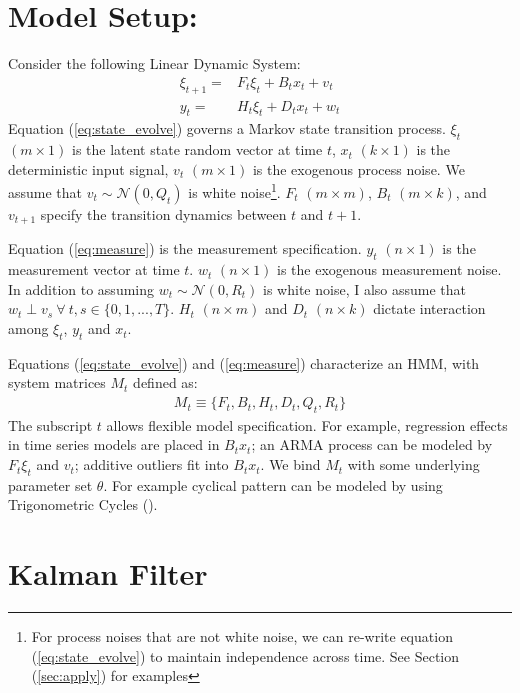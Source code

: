 \documentclass[12pt]{article}
\numberwithin{equation}{section}
\begin{document}
\section{Model Setup:} \label{sec:model_setup}
Consider the following Linear Dynamic System:
\begin{align}
    \xi_{t+1} = & F_{t}\xi_{t} + B_{t}x_t + v_t \label{eq:state_evolve} \\
    y_t = & H_t\xi_{t} + D_{t}x_t + w_t \label{eq:measure}
\end{align}
Equation (\ref{eq:state_evolve}) governs a Markov state transition process. $\xi_t$ $(m\times 1)$ is the latent state random vector at time $t$, $x_t$ $(k\times 1)$ is the deterministic input signal, $v_t$ $(m\times 1)$ is the exogenous process noise. We assume that $v_t\sim \mathcal{N}(0,Q_t)$ is white noise\footnote{For process noises that are not white noise, we can re-write equation (\ref{eq:state_evolve}) to maintain independence across time. See Section (\ref{sec:apply}) for examples}. $F_t$ $(m\times m)$, $B_t$ $(m\times k)$, and $v_{t+1}$ specify the transition dynamics between $t$ and $t+1$. 

Equation (\ref{eq:measure}) is the measurement specification. $y_t$ $(n\times 1)$ is the measurement vector at time $t$. $w_t$ $(n\times 1)$ is the exogenous measurement noise. In addition to assuming $w_t\sim \mathcal{N}(0, R_t)$ is white noise, I also assume that  $w_t \perp v_s \ \forall\  t,s\in\{0,1,...,T\}$. $H_t$ $(n\times m)$ and $D_t$ $(n\times k)$ dictate interaction among $\xi_t$, $y_t$ and $x_t$. 

Equations (\ref{eq:state_evolve}) and (\ref{eq:measure}) characterize an HMM, with system matrices $M_t$ defined as:
\begin{align*}
M_t\equiv\{F_t, B_t, H_t, D_t, Q_t, R_t\}
\end{align*}
The subscript $t$ allows flexible model specification. For example, regression effects in time series models are placed in $B_t x_t$; an ARMA process can be modeled by $F_t\xi_t$ and $v_t$; additive outliers fit into $B_t x_t$. We bind $M_t$ with some underlying parameter set $\theta$. For example cyclical pattern can be modeled by using Trigonometric Cycles (\cite{harvey_1985}).  

\section{Kalman Filter} \label{sec:filter}
\end{document}
